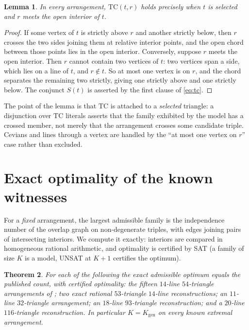 \documentclass[11pt]{article}
\newtheorem{theorem}{Theorem}
\newtheorem{lemma}[theorem]{Lemma}
\theoremstyle{definition}
\newcommand{\Kgen}{K_{\mathrm{gen}}}
\begin{document}
\begin{lemma}\label{lem:tc}
In every arrangement, $\mathrm{TC}(t,r)$ holds precisely when $t$ is selected
and $r$ meets the open interior of $t$.
\end{lemma}

\begin{proof}
If some vertex of $t$ is strictly above $r$ and another strictly below, then
$r$ crosses the two sides joining them at relative interior points, and the
open chord between those points lies in the open interior. Conversely,
suppose $r$ meets the open interior. Then $r$ cannot contain two vertices of
$t$: two vertices span a side, which lies on a line of $t$, and $r\notin t$.
So at most one vertex is on $r$, and the chord separates the remaining two
strictly, giving one strictly above and one strictly below. The conjunct
$S(t)$ is asserted by the first clause of \eqref{eq:tc}.
\end{proof}

The point of the lemma is that $\mathrm{TC}$ is attached to a \emph{selected}
triangle: a disjunction over $\mathrm{TC}$ literals asserts that the family
exhibited by the model has a crossed member, not merely that the arrangement
crosses some candidate triple. Cevians and lines through a vertex are handled
by the ``at most one vertex on $r$'' case rather than excluded.

\section{Exact optimality of the known witnesses}

For a \emph{fixed} arrangement, the largest admissible family is the
independence number of the overlap graph on non-degenerate triples, with
edges joining pairs of intersecting interiors. We compute it exactly:
interiors are compared in homogeneous rational arithmetic, and optimality is
certified by SAT (a family of size $K$ is a model, UNSAT at $K+1$ certifies
the optimum).

\begin{theorem}\label{thm:census}
For each of the following the exact admissible optimum equals the published
count, with certified optimality: the fifteen $14$-line $54$-triangle
arrangements of \cite{Maiorana}; two exact rational $53$-triangle $14$-line
reconstructions; an $11$-line $32$-triangle arrangement; an $18$-line
$93$-triangle reconstruction; and a $20$-line $116$-triangle reconstruction.
In particular $K=\Kgen$ on every known extremal arrangement.
\end{theorem}
\end{document}
